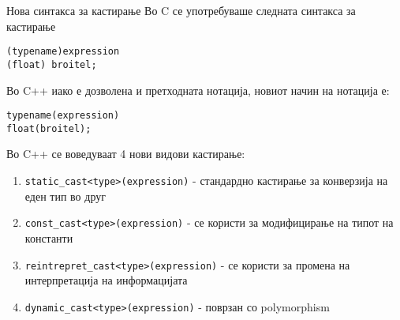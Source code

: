 \begin{frame}[fragile]{Нова синтакса за кастирање}
Во C се употребуваше следната синтакса за кастирање
\begin{lstlisting}
(typename)expression
(float) broitel;
\end{lstlisting}
Во C++ иако е дозволена и претходната нотација, новиот начин на нотација е:
\begin{lstlisting}
typename(expression)
float(broitel);
\end{lstlisting}
Во C++ се воведуваат 4 нови видови кастирање:
\begin{enumerate}
  \item \texttt{static\_cast<type>(expression)} - стандардно кастирање за
  конверзија на еден тип во друг
  \item \texttt{const\_cast<type>(expression)} - се користи за модифицирање на типот на
  константи
  \item \texttt{reintrepret\_cast<type>(expression)} - се користи за промена на
  интерпретација на информацијата
  \item \texttt{dynamic\_cast<type>(expression)} - поврзан со polymorphism
 
\end{enumerate}
\end{frame}
